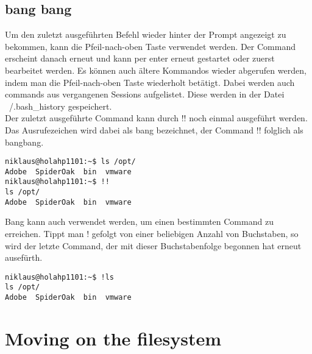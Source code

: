 \documentclass[10pt,paper=a4,final]{scrartcl}
\begin{document}
\subsection{bang bang}
Um den zuletzt ausgef\"uhrten Befehl wieder hinter der Prompt angezeigt zu bekommen, kann die Pfeil-nach-oben Taste verwendet werden. Der Command erscheint danach erneut und kann per enter erneut gestartet oder zuerst bearbeitet werden. Es k\"onnen auch \"altere Kommandos wieder abgerufen werden, indem man die Pfeil-nach-oben Taste wiederholt bet\"atigt. Dabei werden auch commands aus vergangenen Sessions aufgelistet. Diese werden in der Datei ~/.bash\_history gespeichert.\\
Der zuletzt ausgef\"uhrte Command kann durch !! noch einmal ausgef\"uhrt werden. Das Ausrufezeichen wird dabei als bang bezeichnet, der Command !! folglich als bangbang.
\begin{lstlisting}[frame=single]
niklaus@holahp1101:~$ ls /opt/
Adobe  SpiderOak  bin  vmware
niklaus@holahp1101:~$ !!
ls /opt/
Adobe  SpiderOak  bin  vmware
\end{lstlisting}
Bang kann auch verwendet werden, um einen bestimmten Command zu erreichen. Tippt man ! gefolgt von einer beliebigen Anzahl von Buchstaben, so wird der letzte Command, der mit dieser Buchstabenfolge begonnen hat erneut ausef\"urth.
\begin{lstlisting}[frame=single]
niklaus@holahp1101:~$ !ls
ls /opt/
Adobe  SpiderOak  bin  vmware
\end{lstlisting}

\section{Moving on the filesystem}
\end{document}
